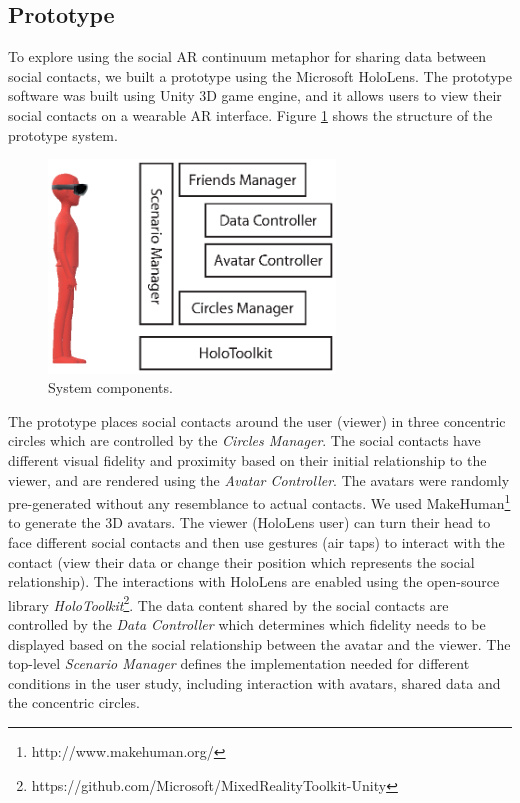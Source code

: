 \subsection{Prototype}

To explore using the social AR continuum metaphor for sharing data between social contacts, we built a prototype using the Microsoft HoloLens. The prototype software was built using Unity 3D game engine, and it allows users to view their social contacts on a wearable AR interface. Figure \ref{fig:data:system} shows the structure of the prototype system. 

\begin{figure}[ht]
    \centering
    \includegraphics[width=3in]{images/chi/images-03.eps}
    \caption{System components.}
    \label{fig:data:system}
\end{figure}

The prototype places social contacts around the user (viewer) in three concentric circles which are controlled by the \textit{Circles Manager}. The social contacts have different visual fidelity and proximity based on their initial relationship to the viewer, and are rendered using the \textit{Avatar Controller}. The avatars were randomly pre-generated without any resemblance to actual contacts. We used MakeHuman\footnote{http://www.makehuman.org/} to generate the 3D avatars. The viewer (HoloLens user) can turn their head to face different social contacts and then use gestures (air taps) to interact with the contact (view their data or change their position which represents the social relationship). The interactions with HoloLens are enabled using the open-source library \textit{HoloToolkit}\footnote{https://github.com/Microsoft/MixedRealityToolkit-Unity}. The data content shared by the social contacts are controlled by the \textit{Data Controller} which determines which fidelity needs to be displayed based on the social relationship between the avatar and the viewer. The top-level \textit{Scenario Manager} defines the implementation needed for different conditions in the user study, including interaction with avatars, shared data and the concentric circles. 

